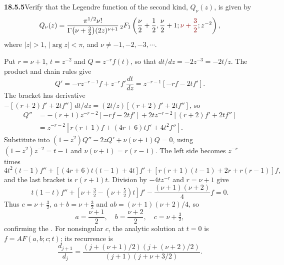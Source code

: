 \par\bigskip
\noindent\textbf{18.5.5}\quad Verify that the Legendre function of
the second kind, $Q_{\nu}(z)$, is given by
\[
Q_{\nu}(z)=\frac{\pi^{1/2}\nu!}{\Gamma\big(\nu+\frac{3}{2}\big)
(2z)^{\nu+1}}\,{}_{2}F_{1}\left(\frac{\nu}{2}+\frac{1}{2},
\frac{\nu}{2}+1;\erratum{\nu+\frac{3}{2}};z^{-2}\right),
\]
where $|z| > 1$, $|\arg z| < \pi$, and
$\nu\neq-1,-2,-3,\cdots$.
\par\nobreak
\solution
Put $r=\nu+1$, $t=z^{-2}$ and $Q=z^{-r}f(t)$, so that
$dt/dz=-2z^{-3}=-2t/z$.  The product and chain rules give
\[
Q'=-rz^{-r-1}f+z^{-r}f'\frac{dt}{dz}=z^{-r-1}[-rf-2tf'].
\]
The bracket has derivative
$-[(r+2)f'+2tf'']\,dt/dz=(2t/z)[(r+2)f'+2tf'']$, so
\begin{align*}
Q''&=-(r+1)z^{-r-2}[-rf-2tf']+2tz^{-r-2}[(r+2)f'+2tf'']\\
 &=z^{-r-2}[r(r+1)f+(4r+6)tf'+4t^2f''].
\end{align*}
Substitute into $(1-z^2)Q''-2zQ'+\nu(\nu+1)Q=0$, using
$(1-z^2)z^{-2}=t-1$ and $\nu(\nu+1)=r(r-1)$.  The left side becomes
$z^{-r}$ times
\[
4t^2(t-1)f''+[(4r+6)t(t-1)+4t]f'+[r(r+1)(t-1)+2r+r(r-1)]f,
\]
and the last bracket is $r(r+1)t$.  Division by $-4tz^{-r}$ and
$r=\nu+1$ give
\[
t(1-t)f''+[\nu+\tfrac32-(\nu+\tfrac52)t]f'
 -\frac{(\nu+1)(\nu+2)}4 f=0.
\]
Thus $c=\nu+\frac32$, $a+b=\nu+\frac32$ and
$ab=(\nu+1)(\nu+2)/4$, so
\[
a=\frac{\nu+1}{2},\quad b=\frac{\nu+2}{2},\quad
\boxed{c=\nu+\tfrac32},
\]
confirming the .  For nonsingular $c$, the analytic solution at $t=0$
is $f=A F(a,b;c;t)$; its recurrence is
\[
\frac{d_{j+1}}{d_j}
 =\frac{(j+(\nu+1)/2)(j+(\nu+2)/2)}{(j+1)(j+\nu+3/2)}.
\]


